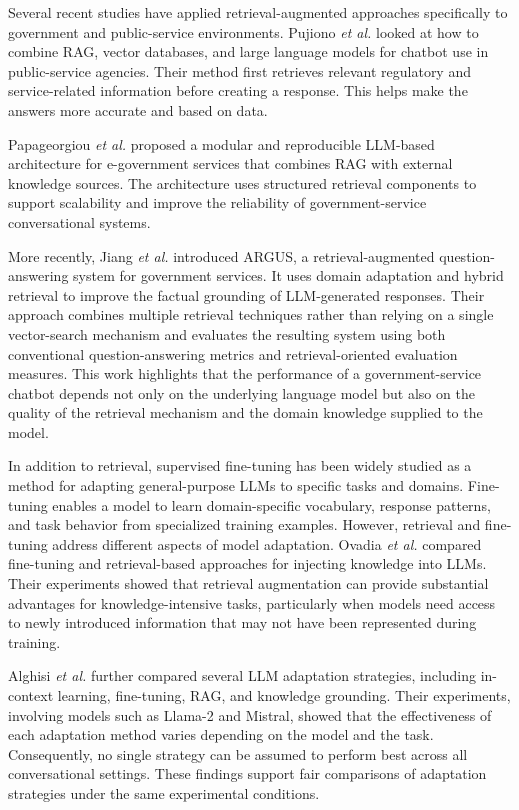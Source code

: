 \documentclass[10pt,journal,compsoc]{IEEEtran}
\begin{document}
Several recent studies have applied retrieval-augmented approaches specifically to government and public-service environments. Pujiono  \textit{et al.}  \cite{pujiono2024rag} looked at how to combine RAG, vector databases, and large language models for chatbot use in public-service agencies. Their method first retrieves relevant regulatory and service-related information before creating a response. This helps make the answers more accurate and based on data.

Papageorgiou \textit{et al.} \cite{papageorgiou2024egovernment} proposed a modular and reproducible LLM-based architecture for e-government services that combines RAG with external knowledge sources. The architecture uses structured retrieval components to support scalability and improve the reliability of government-service conversational systems.


More recently, Jiang \textit{et al.} \cite{jiang2025argus} introduced ARGUS, a retrieval-augmented question-answering system for government services. It uses domain adaptation and hybrid retrieval to improve the factual grounding of LLM-generated responses. Their approach combines multiple retrieval techniques rather than relying on a single vector-search mechanism and evaluates the resulting system using both conventional question-answering metrics and retrieval-oriented evaluation measures. This work highlights that the performance of a government-service chatbot depends not only on the underlying language model but also on the quality of the retrieval mechanism and the domain knowledge supplied to the model.

In addition to retrieval, supervised fine-tuning has been widely studied as a method for adapting general-purpose LLMs to specific tasks and domains. Fine-tuning enables a model to learn domain-specific vocabulary, response patterns, and task behavior from specialized training examples. However, retrieval and fine-tuning address different aspects of model adaptation. Ovadia \textit{et al.} \cite{ovadia2024finetuning} compared fine-tuning and retrieval-based approaches for injecting knowledge into LLMs. Their experiments showed that retrieval augmentation can provide substantial advantages for knowledge-intensive tasks, particularly when models need access to newly introduced information that may not have been represented during training.

Alghisi \textit{et al.} \cite{alghisi2024finetunerag} further compared several LLM adaptation strategies, including in-context learning, fine-tuning, RAG, and knowledge grounding. Their experiments, involving models such as Llama-2 and Mistral, showed that the effectiveness of each adaptation method varies depending on the model and the task. Consequently, no single strategy can be assumed to perform best across all conversational settings. These findings support fair comparisons of adaptation strategies under the same experimental conditions.
\end{document}
